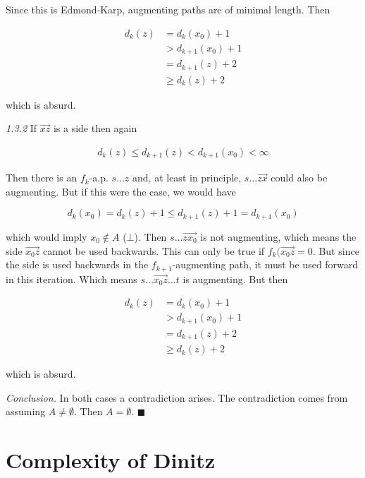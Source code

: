 \documentclass[a4paper, 12pt]{article}
\begin{document}
Since this is Edmond-Karp, augmenting paths are of minimal length. Then 

\begin{align*}
    d_{k}(z) &= d_k(x_0) + 1   \\ 
             &> d_{k+1}(x_0) + 1 \\ 
             &=d_{k+1}(z) + 2 \\ 
             & \geq d_{k}(z) + 2
\end{align*}

which is absurd.

\textit{1.3.2} If  $\overrightarrow{xz}$ is a side then again

\begin{align*}
    d_k(z) \leq d_{k+1}(z) < d_{k+1}(x_0) < \infty
\end{align*}

Then there is an $f_k$-a.p. $s \ldots z$ and, at least in principle, 
$s \ldots \overrightarrow{zx}$ could also be augmenting. But if this were the case,
we would have 

$$
d_k(x_0) = d_k(z) + 1 \leq d_{k+1}(z) + 1 = d_{k+1}(x_0) 
$$

which would imply $x_0 \not\in A$ ($\bot$). Then $s \ldots \overrightarrow{zx_0}$ is 
not augmenting, which means the side $\overrightarrow{x_0z}$ cannot 
be used backwards. This can only be true if $f_k(\overrightarrow{x_0z} = 0$.
But since the side is used backwards in the $f_{k+1}$-augmenting path,
it must be used forward in this iteration. Which means $s \ldots \overrightarrow{x_0z} \ldots t$
is augmenting. But then 

\begin{align*}
    d_{k}(z) &= d_{k}(x_0) + 1 \\ 
             &> d_{k+1}(x_0) + 1 \\ 
             &= d_{k+1}(z) +2 \\ 
             &\geq d_{k}(z) + 2 
\end{align*}

which is absurd.

\textit{Conclusion.} In both cases a contradiction arises. The contradiction
comes from assuming $A \neq \emptyset$. Then $A = \emptyset$. $\blacksquare$


\pagebreak

\section{Complexity of Dinitz}
\end{document}
